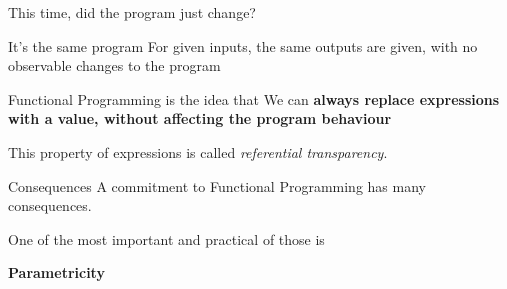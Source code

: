 \begin{frame}
\begin{center}
This time, did the program just change?
\end{center}
\end{frame}

\begin{frame}
\begin{block}{It's the same program}
For given inputs, the same outputs are given, with no observable changes to the program
\end{block}
\end{frame}

\begin{frame}
\begin{block}{Functional Programming is the idea that}
We can \textbf{always replace expressions with a value, without affecting the program behaviour}
\end{block}
\begin{center}
\tiny{This property of expressions is called \emph{referential transparency}.}
\end{center}
\end{frame}
\begin{frame}
\begin{block}{Consequences}
A commitment to Functional Programming has many consequences.
\end{block}
\end{frame}

\begin{frame}
\begin{center}
One of the most important and practical of those is
\end{center}
\begin{center}
\textbf{Parametricity}
\end{center}
\end{frame}
